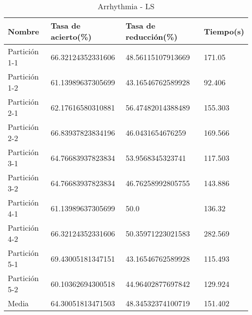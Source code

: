 \begin{table}[H]
	\centering
	\begin{tabular}{l|lll}
		Nombre        & Tasa de acierto(\%) & Tasa de reducción(\%) & Tiempo(s) \\ \hline
		Partición 1-1 & 66.32124352331606   & 48.56115107913669     & 171.05    \\
		Partición 1-2 & 61.13989637305699   & 43.16546762589928     & 92.406    \\
		Partición 2-1 & 62.17616580310881   & 56.47482014388489     & 155.303   \\
		Partición 2-2 & 66.83937823834196   & 46.0431654676259      & 169.566   \\
		Partición 3-1 & 64.76683937823834   & 53.9568345323741      & 117.503   \\
		Partición 3-2 & 64.76683937823834   & 46.76258992805755     & 143.886   \\
		Partición 4-1 & 61.13989637305699   & 50.0                  & 136.32    \\
		Partición 4-2 & 66.32124352331606   & 50.35971223021583     & 282.569   \\
		Partición 5-1 & 69.43005181347151   & 43.16546762589928     & 115.493   \\
		Partición 5-2 & 60.10362694300518   & 44.96402877697842     & 129.924   \\ \hline
		Media         & 64.30051813471503   & 48.34532374100719     & 151.402  
	\end{tabular}
	\caption{Arrhythmia - LS}
	\label{ARRH-LS}
\end{table}